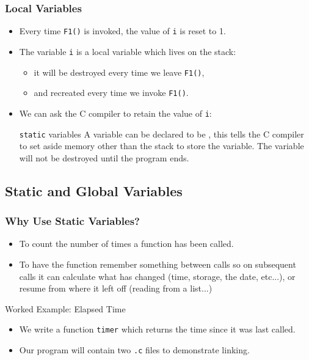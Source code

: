 \documentclass[smaller,table]{beamer} %
\begin{document}
\begin{frame}
\frametitle{Local Variables}
\begin{itemize}
\item Every time {\tt F1()} is invoked, the value of {\tt i} is reset to 1.
\item The variable {\tt i} is a local variable which lives on the stack:
\begin{itemize}
\item it will be destroyed every time we leave {\tt F1()},
\item and recreated every time we invoke {\tt F1()}.
\end{itemize}
\item We can ask the C compiler to retain the value of {\tt i}:
\begin{block}{{\tt static} variables}
A variable can be declared to be , this tells the C compiler to set aside memory other than the stack to store the variable. The variable will not be destroyed until the program ends.
\end{block}
\end{itemize}
\end{frame}

\subsection{Static and Global Variables}
\begin{frame}
\frametitle{Why Use Static Variables?}
\begin{itemize}
\item To count the number of times a function has been called.
\item To have the function remember something between calls so on subsequent calls it can calculate what has changed (time, storage, the date, etc...), or resume from where it left off (reading from a list...)
\end{itemize}

\begin{exampleblock}{Worked Example: Elapsed Time}
\begin{itemize}
\item We write a function {\tt timer} which returns the time since it was last called.
\item Our program will contain two {\tt .c} files to demonstrate linking.
\end{itemize}
\end{exampleblock}
\end{frame}
\end{document}

